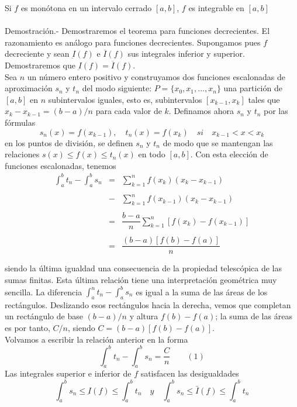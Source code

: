 \begin{multicols}{2}
\begin{teo} Si $f$ es monótona en un intervalo cerrado $[a,b]$, $f$ es integrable en $[a,b]$\\\\
    Demostración.-\; Demostraremos el teorema para funciones decrecientes. El razonamiento es análogo para funciones decrecientes. Supongamos pues $f$ decreciente y sean $\underbar{I}(f)$ e $\overline{I}(f)$ sus integrales inferior y superior. Demostraremos que $\underbar{I}(f)=\overline{I}(f)$. \\
    Sea $n$ un número entero positivo y construyamos dos funciones escalonadas de aproximación $s_n$ y $t_n$ del modo siguiente: $P=\lbrace x_0,x_1,...,x_n \rbrace$ una partición de $[a,b]$ en $n$ subintervalos iguales, esto es, subintervalos $[x_{k-1},x_k]$ tales que $x_k-x_{k-1} = (b-a)/n$ para cada valor de $k$. Definamos ahora $s_n$ y $t_n$ por las fórmulas $$s_n(x)=f(x_{k-1}), \quad t_n(x)=f(x_k) \quad si \quad x_{k-1}<x<x_k$$ en los puntos de división, se definen $s_n$ y $t_n$ de modo que se mantengan las relaciones $s(x)\leq f(x) \leq t_n(x)$ en todo $[a,b]$. Con esta elección de funciones escalonadas, tenemos 
    $$\begin{array}{rcl}
	\int_a^b t_n - \int_a^b s_n &=& \sum\limits_{k=1}^n f(x_k)(x_k-x_{k-1})\\\\
				    &-& \sum\limits_{k=1}^n f(x_{k-1})(x_k-x_{k-1})\\\\
				    &=& \dfrac{b-a}{n}\sum\limits_{k=1}^n \left[f(x_{k}) - f(x_{k-1})\right]\\\\
				    &=&\dfrac{(b-a)\left[f(b)-f(a)\right]}{n}\\\\
    \end{array}$$
    siendo la última igualdad una consecuencia de la propiedad telescópica de las sumas finitas. Esta última relación tiene una interpretación geométrica muy sencilla. La diferencia $\int_a^n t_n - \int_a^b s_n$ es igual a la suma de las áreas de los rectángulos. Deslizando esos rectángulos hacia la derecha, vemos que completan un rectángulo de base $(b-a)/n$ y altura $f(b)-f(a)$; la suma de las áreas es por tanto, $C/n$, siendo $C=(b-a)\left[f(b)-f(a)\right]$.\\
    Volvamos a escribir la relación anterior en la forma $$\int_a^b t_n - \int_a^b s_n = \dfrac{C}{n} \qquad (1)$$
    Las integrales superior e inferior de $f$ satisfacen las desigualdades $$\int_a^b s_n \leq \underbar{I}(f) \leq \int_a^b t_n \quad y \quad \int_a^b s_n \leq \bar{I}(f)\leq \int_a^b t_n$$

\end{teo}
\end{multicols}
